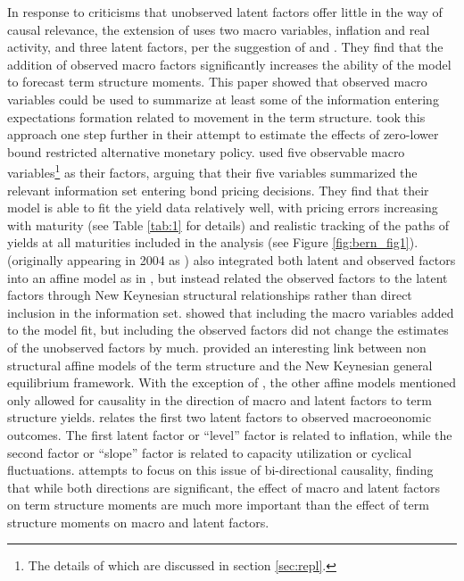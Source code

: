 \documentclass{article}
\numberwithin{equation}{section}
\begin{document}
In response to criticisms that unobserved latent factors offer little in the
way of causal relevance, the \citet{ang2003no} extension of
\citet{daisingleton2000} uses two macro variables, inflation and real activity,
and three latent factors, per the suggestion of \citet{litterman1991common} and
\citet{nelson1987}. They find that the addition of observed macro factors
significantly increases the ability of the model to forecast term structure
moments. This paper showed that observed macro variables could be used to
summarize at least some of the information entering expectations formation
related to movement in the term structure.  \citet{sack2005monetary} took this
approach one step further in their attempt to estimate the effects of
zero-lower bound restricted alternative monetary policy.
\citet{sack2005monetary} used five observable macro variables\footnote{The
  details of which are discussed in section \ref{sec:repl}.} 
as their factors, arguing that their five variables summarized the relevant
information set entering bond pricing decisions. They find that their model is
able to fit the yield data relatively well, with pricing errors increasing with
maturity (see Table \ref{tab:1} for details) and realistic tracking of
the paths of yields at all maturities included in the analysis (see Figure
\ref{fig:bern_fig1}). \citet{rudebusch2008macro} (originally appearing in 2004
as \citet{rudebusch2004macro}) also integrated both latent and observed factors
into an affine model as in \citet{ang2003no}, but instead related the observed
factors to the latent factors through New Keynesian structural relationships
rather than direct inclusion in the information set.
\citet{rudebusch2008macro} showed that including the macro variables added to
the model fit, but including the observed factors did not change the estimates
of the unobserved factors by much.  \citet{diebold2006macroeconomy} provided an
interesting link between non structural affine models of the term structure and
the New Keynesian general equilibrium framework. With the exception of
\citet{rudebusch2008macro}, the other affine models mentioned only allowed for
causality in the direction of macro and latent factors to term structure
yields.  \citet{diebold2006macroeconomy} relates the first two latent factors
to observed macroeonomic outcomes. The first latent factor or ``level'' factor
is related to inflation, while the second factor or ``slope'' factor is related
to capacity utilization or cyclical fluctuations.
\citet{diebold2006macroeconomy} attempts to focus on this issue of
bi-directional causality, finding that while both directions are significant,
the effect of macro and latent factors on term structure moments are much more
important than the effect of term structure moments on macro and latent
factors.
\end{document}

